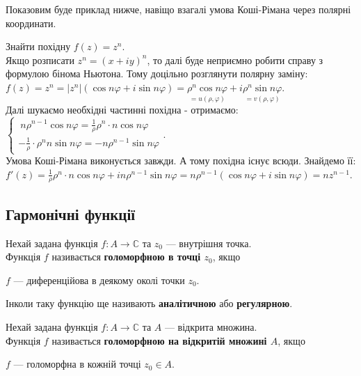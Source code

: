\documentclass{math_library}
\begin{document}
Показовим буде приклад нижче, навіщо взагалі умова Коші-Рімана через полярні координати.

\begin{example}
Знайти похідну $f(z)=z^n$.\\
Якщо розписати $z^n = (x+iy)^n$, то далі буде неприємно робити справу з формулою бінома Ньютона. Тому доцільно розглянути полярну заміну:\\
$f(z) = z^n = |z^n|(\cos n \varphi + i\sin n \varphi) = \underset{=u(\rho, \varphi)}{\rho^n \cos n\varphi}  + i \underset{=v(\rho, \varphi)}{\rho^n \sin n\varphi}$.\\
Далі шукаємо необхідні частинні похідна - отримаємо:\\
$\begin{cases}
		\displaystyle\ n \rho^{n-1} \cos n\varphi = \frac{1}{\rho} \rho^n \cdot n \cos n \varphi \\
		\displaystyle -\frac{1}{\rho} \cdot \rho^n n \sin n \varphi =- n \rho^{n-1} \sin n \varphi
	\end{cases}$.\\
	Умова Коші-Рімана виконується завжди. А тому похідна існує всюди. Знайдемо її:\\
	$f'(z)= \displaystyle \frac{1}{\rho} \rho^n \cdot n \cos n \varphi + i n \rho^{n-1} \sin n \varphi = n\rho^{n-1}\left(\cos n\varphi + i \sin n\varphi  \right) = nz^{n-1}$.
\end{example}
	
\subsection{Гармонічні функції}
\begin{definition}
Нехай задана функція $f \colon A \to \mathbb{C}$ та $z_0$ --- внутрішня точка.\\
Функція $f$ називається \textbf{голоморфною в точці $z_0$}, якщо
\begin{center}
$f$ --- диференційова в деякому околі точки $z_0$.
\end{center}
Інколи таку функцію ще називають \textbf{аналітичною} або \textbf{регулярною}.
\end{definition}

\begin{definition}
Нехай задана функція $f \colon A \to \mathbb{C}$ та $A$ --- відкрита множина.\\
Функція $f$ називається \textbf{голоморфною на відкритій множині $A$}, якщо
\begin{center}
$f$ --- голоморфна в кожній точці $z_0 \in A$.
\end{center}
\end{definition}
\end{document}
